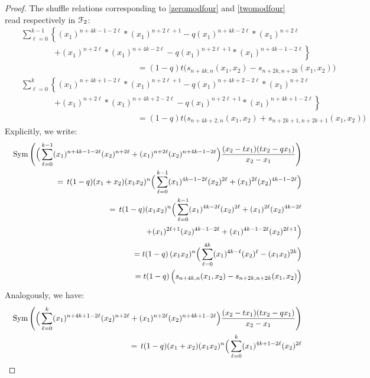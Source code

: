 \begin{proof}
The shuffle relations corresponding to \eqref{zeromodfour} and \eqref{twomodfour} read respectively in $\mathcal F_2$:
\begin{eqnarray*}
&&\sum_{\ell=0}^{k-1} \left\{ (x_1)^{n+4k-1-2\ell} * (x_1)^{n+2\ell+1}-q (x_1)^{n+4k-2\ell} * (x_1)^{n+2\ell}
\right.\\
&&\qquad \qquad \left. 
+(x_1)^{n+2\ell} * (x_1)^{n+4k-2\ell}-q (x_1)^{n+2\ell+1} * (x_1)^{n+4k-1-2\ell} \right\}\\
&&\qquad \qquad\qquad\qquad\qquad\qquad\qquad = (1-q)t \big(s_{n+4k,n}(x_1,x_2)-s_{n+2k,n+2k}(x_1,x_2)\big)\\
&&\sum_{\ell=0}^{k} \left\{ (x_1)^{n+4k+1-2\ell} * (x_1)^{n+2\ell+1}-q (x_1)^{n+4k+2-2\ell} * (x_1)^{n+2\ell}\right.\\
&&\qquad \qquad \left. +(x_1)^{n+2\ell} * (x_1)^{n+4k+2-2\ell}-q (x_1)^{n+2\ell+1} * (x_1)^{n+4k+1-2\ell} \right\}\\
&&\qquad \qquad\qquad\qquad\qquad\qquad\qquad =(1-q)t \big(s_{n+4k+2,n}(x_1,x_2)+s_{n+2k+1,n+2k+1}(x_1,x_2)\big)
\end{eqnarray*}
Explicitly, we write:
\begin{eqnarray*}
&&{\rm Sym}\left( \Big(\sum_{\ell=0}^{k-1} (x_1)^{n+4k-1-2\ell} (x_2)^{n+2\ell}+(x_1)^{n+2\ell}(x_2)^{n+4k-1-2\ell}\Big)
\frac{(x_2-t x_1)(t x_2-q x_1)}{x_2-x_1}\right) \\
&&=\, 
t(1-q)(x_1+x_2) (x_1x_2)^{n} \Big(\sum_{\ell=0}^{k-1} (x_1)^{4k-1-2\ell} (x_2)^{2\ell}
+(x_1)^{2\ell}(x_2)^{4k-1-2\ell}\Big)\\
&&=\, 
t(1-q)(x_1x_2)^{n} \Big(\sum_{\ell=0}^{k-1} (x_1)^{4k-2\ell} (x_2)^{2\ell}+(x_1)^{2\ell}(x_2)^{4k-2\ell} \\
&&\qquad \qquad\qquad\qquad\qquad+(x_1)^{2\ell+1}(x_2)^{4k-1-2\ell}+(x_1)^{4k-1-2\ell}(x_2)^{2\ell+1}\Big)\\
&&\qquad \qquad =t(1-q)\, (x_1x_2)^{n}  \Big(\sum_{\ell=0}^{4k}(x_1)^{4k-\ell} (x_2)^{\ell} -(x_1x_2)^{2k}\Big)\\
&&\qquad \qquad =t(1-q)\, \Big(s_{n+4k,n}(x_1,x_2)-s_{n+2k,n+2k}(x_1,x_2)\Big)
\end{eqnarray*}
Analogously, we have:
\begin{eqnarray*}
&&{\rm Sym}\left( \Big(\sum_{\ell=0}^{k} (x_1)^{n+4k+1-2\ell} (x_2)^{n+2\ell}+(x_1)^{n+2\ell}(x_2)^{n+4k+1-2\ell}\Big)
\frac{(x_2-t x_1)(t x_2-q x_1)}{x_2-x_1}\right) \\
&&=\, 
t(1-q)(x_1+x_2) (x_1x_2)^{n} \Big(\sum_{\ell=0}^{k} (x_1)^{4k+1-2\ell} (x_2)^{2\ell}

\end{eqnarray*}
\end{proof}
